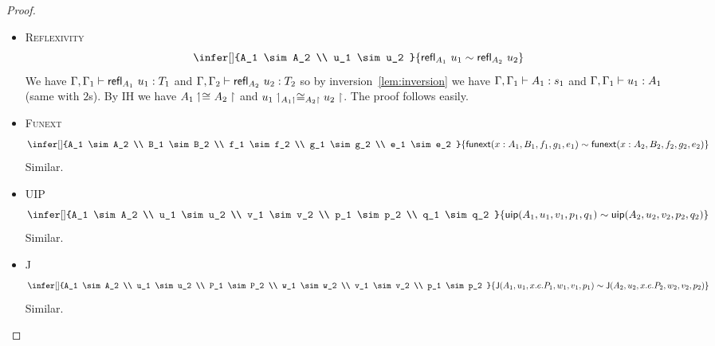\begin{proof}
\begin{itemize}
    \item \textsc{Reflexivity}
    \[
      \infer[]
        {A_1 \sim A_2 \\
         u_1 \sim u_2
        }
        {\refl{A_1} u_1 \sim \refl{A_2} u_2}
    \]
    We have $\isterm{\Ga, \Ga_1}{\refl{A_1} u_1}{T_1}$ and
    $\isterm{\Ga, \Ga_2}{\refl{A_2} u_2}{T_2}$ so by
    inversion~\eqref{lem:inversion} we have $\isterm{\Ga, \Ga_1}{A_1}{s_1}$ and
    $\isterm{\Ga, \Ga_1}{u_1}{A_1}$
    (same with $2$s). By IH we have $\Heq{}{\lo{A_1}}{}{\ro{A_2}}$ and
    $\Heq{\lo{A_1}}{\lo{u_1}}{\ro{A_2}}{\ro{u_2}}$.
    The proof follows easily.

    \item \textsc{Funext}
    \[
      \infer[]
        {A_1 \sim A_2 \\
         B_1 \sim B_2 \\
         f_1 \sim f_2 \\
         g_1 \sim g_2 \\
         e_1 \sim e_2
        }
        {\funext{x:A_1}{B_1}{f_1}{g_1}{e_1}
         \sim \funext{x:A_2}{B_2}{f_2}{g_2}{e_2}
        }
    \]
    Similar.

    \item \textsc{UIP}
    \[
      \infer[]
        {A_1 \sim A_2 \\
         u_1 \sim u_2 \\
         v_1 \sim v_2 \\
         p_1 \sim p_2 \\
         q_1 \sim q_2
        }
        {\uip{A_1}{u_1}{v_1}{p_1}{q_1} \sim \uip{A_2}{u_2}{v_2}{p_2}{q_2}}
    \]
    Similar.

    \item \textsc{J}
    \[
      \infer[]
        {A_1 \sim A_2 \\
         u_1 \sim u_2 \\
         P_1 \sim P_2 \\
         w_1 \sim w_2 \\
         v_1 \sim v_2 \\
         p_1 \sim p_2
        }
        {\J{A_1}{u_1}{x.e.P_1}{w_1}{v_1}{p_1} \sim
         \J{A_2}{u_2}{x.e.P_2}{w_2}{v_2}{p_2}
        }
    \]
    Similar.
  \end{itemize}
\end{proof}

